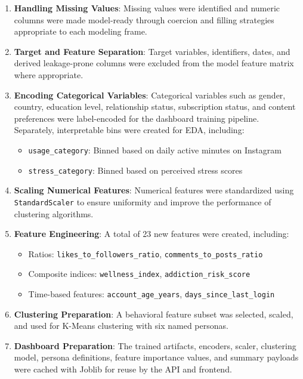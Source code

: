 \documentclass[12pt,a4paper]{article}
\begin{document}
\begin{enumerate}
    \item \textbf{Handling Missing Values}: Missing values were identified and numeric columns were made model-ready through coercion and filling strategies appropriate to each modeling frame.
    
    \item \textbf{Target and Feature Separation}: Target variables, identifiers, dates, and derived leakage-prone columns were excluded from the model feature matrix where appropriate.
    
    \item \textbf{Encoding Categorical Variables}: Categorical variables such as gender, country, education level, relationship status, subscription status, and content preferences were label-encoded for the dashboard training pipeline. Separately, interpretable bins were created for EDA, including:
    \begin{itemize}
        \item \texttt{usage\_category}: Binned based on daily active minutes on Instagram
        \item \texttt{stress\_category}: Binned based on perceived stress scores
    \end{itemize}
    
    \item \textbf{Scaling Numerical Features}: Numerical features were standardized using \texttt{StandardScaler} to ensure uniformity and improve the performance of clustering algorithms.
    
    \item \textbf{Feature Engineering}: A total of 23 new features were created, including:
    \begin{itemize}
        \item Ratios: \texttt{likes\_to\_followers\_ratio}, \texttt{comments\_to\_posts\_ratio}
        \item Composite indices: \texttt{wellness\_index}, \texttt{addiction\_risk\_score}
        \item Time-based features: \texttt{account\_age\_years}, \texttt{days\_since\_last\_login}
    \end{itemize}
    
    \item \textbf{Clustering Preparation}: A behavioral feature subset was selected, scaled, and used for K-Means clustering with six named personas.
    
    \item \textbf{Dashboard Preparation}: The trained artifacts, encoders, scaler, clustering model, persona definitions, feature importance values, and summary payloads were cached with Joblib for reuse by the API and frontend.
\end{enumerate}
\end{document}
